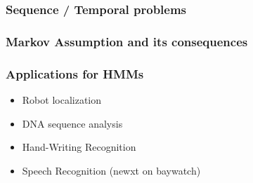 
\begin{frame}
  \frametitle{Sequence / Temporal problems}
  
\end{frame}

\begin{frame}
  \frametitle{Markov Assumption and its consequences}
  
  
\end{frame}


\begin{frame}
  \frametitle{Applications for HMMs}
  \begin{itemize}[<+->]
  \item Robot localization
  \item DNA sequence analysis
  \item Hand-Writing Recognition
  \item Speech Recognition (newxt on baywatch)
  \end{itemize}
\end{frame}
